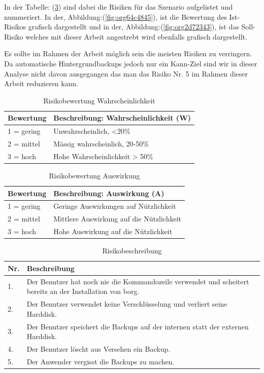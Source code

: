 In der Tabelle: (\ref{tab:org907910f}) sind dabei die Risiken für das
Szenario aufgelistet und nummeriert. In der, Abbildung:(\ref{fig:org64c4845}), ist die
Bewertung des Ist-Risikos grafisch dargestellt und in der,
Abbildung:(\ref{fig:org2d72343}), ist das Soll-Risiko welches mit dieser Arbeit
angestrebt wird ebenfalls grafisch dargestellt.

Es sollte im Rahmen der Arbeit möglich sein die meisten Risiken zu verringern.
Da automatische Hintergrundbackups jedoch nur ein Kann-Ziel sind wir in dieser
Analyse nicht davon ausgegangen das man das Risiko Nr. 5 im Rahmen dieser
Arbeit reduzieren kann.

\begin{table}[H]
\centering
\begin{tabular}{l|l}
\textbf{Bewertung} & \textbf{Beschreibung: Wahrscheinlichkeit (W)}\\
\hline
1 = gering & Unwahrscheinlich, <20\%\\
2 = mittel & Mässig wahrscheinlich, 20-50\%\\
3 = hoch & Hohe Wahrscheinlichkeit > 50\%\\
\end{tabular}
\caption{\label{tab:org3741bc7}
Risikobewertung Wahrscheinlichkeit}

\end{table}

\begin{table}[H]
\centering
\begin{tabular}{l|l}
\textbf{Bewertung} & \textbf{Beschreibung: Auswirkung (A)}\\
\hline
1 = gering & Geringe Auswirkungen auf Nützlichkeit\\
2 = mittel & Mittlere Auswirkung auf die Nützlichkeit\\
3 = hoch & Hohe Auswirkung auf die Nützlichkeit\\
\end{tabular}
\caption{\label{tab:org9895941}
Risikobewertung Auswirkung}

\end{table}

\begin{table}[H]
\centering
\begin{tabular}{|>{\columncolor[HTML]{EFEFEF}}p{}|p{}|}
\hline
\textbf{Nr.}\cellcolor[HTML]{C0C0C0} & \textbf{Beschreibung}\cellcolor[HTML]{C0C0C0}\\
\hline
1. & Der Benutzer hat noch nie die Kommandozeile verwendet und scheitert bereits an der Installation von \gls{borg}.\\
\hline
2. & Der Benutzer verwendet keine Verschlüsselung und verliert seine Harddisk.\\
\hline
3. & Der Benutzer speichert die Backups auf der internen statt der externen Harddisk.\\
\hline
4. & Der Benutzer löscht aus Versehen ein Backup.\\
\hline
5. & Der Anwender vergisst die Backups zu machen.\\
\hline
\end{tabular}
\caption{\label{tab:org907910f}
Risikobeschreibung}

\end{table}

